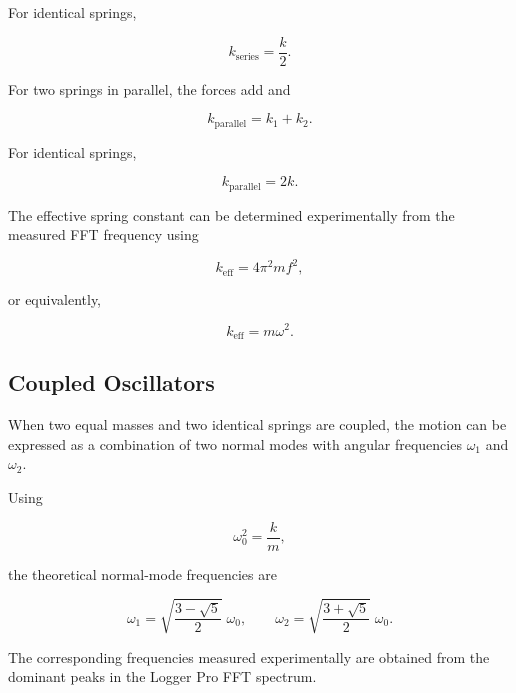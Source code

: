 \documentclass[12pt,a4paper]{article}
\begin{document}
For identical springs,

\begin{equation}
k_{\mathrm{series}}=\frac{k}{2}.
\label{eq:series_identical}
\end{equation}

For two springs in parallel, the forces add and

\begin{equation}
k_{\mathrm{parallel}}=k_1+k_2.
\label{eq:parallel}
\end{equation}

For identical springs,

\begin{equation}
k_{\mathrm{parallel}}=2k.
\label{eq:parallel_identical}
\end{equation}

The effective spring constant can be determined experimentally from the measured FFT frequency using

\begin{equation}
k_{\mathrm{eff}}=4\pi^2mf^2,
\label{eq:keff}
\end{equation}

or equivalently,

\begin{equation}
k_{\mathrm{eff}}=m\omega^2.
\end{equation}

\subsection{Coupled Oscillators}

When two equal masses and two identical springs are coupled, the motion can be expressed as a combination of two normal modes with angular frequencies $\omega_1$ and $\omega_2$.

Using

\begin{equation}
\omega_0^2=\frac{k}{m},
\end{equation}

the theoretical normal-mode frequencies are

\begin{equation}
\omega_1=
\sqrt{\frac{3-\sqrt{5}}{2}}\;\omega_0,
\qquad
\omega_2=
\sqrt{\frac{3+\sqrt{5}}{2}}\;\omega_0.
\label{eq:coupled}
\end{equation}

The corresponding frequencies measured experimentally are obtained from the dominant peaks in the Logger Pro FFT spectrum.
\end{document}

